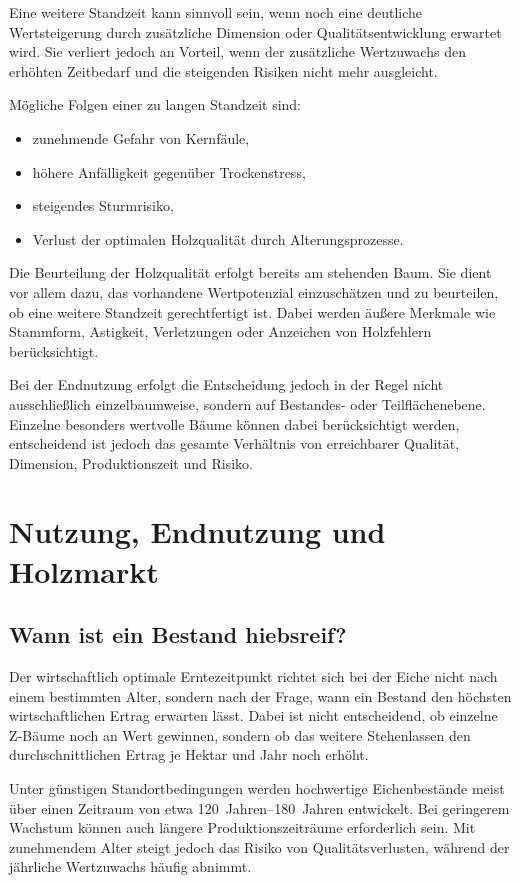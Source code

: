 \documentclass[twocolumn, bibliography=totoc, abstract=true]{scrartcl}
\begin{document}
Eine weitere Standzeit kann sinnvoll sein, wenn noch eine deutliche Wertsteigerung durch zusätzliche Dimension oder Qualitätsentwicklung erwartet wird. Sie verliert jedoch an Vorteil, wenn der zusätzliche Wertzuwachs den erhöhten Zeitbedarf und die steigenden Risiken nicht mehr ausgleicht.

Mögliche Folgen einer zu langen Standzeit sind:

\begin{itemize}
\item zunehmende Gefahr von Kernfäule,
\item höhere Anfälligkeit gegenüber Trockenstress,
\item steigendes Sturmrisiko,
\item Verlust der optimalen Holzqualität durch Alterungsprozesse.
\end{itemize}

Die Beurteilung der Holzqualität erfolgt bereits am stehenden Baum. Sie dient vor allem dazu, das vorhandene Wertpotenzial einzuschätzen und zu beurteilen, ob eine weitere Standzeit gerechtfertigt ist. Dabei werden äußere Merkmale wie Stammform, Astigkeit, Verletzungen oder Anzeichen von Holzfehlern berücksichtigt.

Bei der Endnutzung erfolgt die Entscheidung jedoch in der Regel nicht ausschließlich einzelbaumweise, sondern auf Bestandes- oder Teilflächenebene. Einzelne besonders wertvolle Bäume können dabei berücksichtigt werden, entscheidend ist jedoch das gesamte Verhältnis von erreichbarer Qualität, Dimension, Produktionszeit und Risiko.


\section{Nutzung, Endnutzung und Holzmarkt}

\subsection{Wann ist ein Bestand hiebsreif?}

Der wirtschaftlich optimale Erntezeitpunkt richtet sich bei der Eiche nicht nach einem bestimmten Alter, sondern nach der Frage, wann ein Bestand den höchsten wirtschaftlichen Ertrag erwarten lässt. Dabei ist nicht entscheidend, ob einzelne Z-Bäume noch an Wert gewinnen, sondern ob das weitere Stehenlassen den durchschnittlichen Ertrag je Hektar und Jahr noch erhöht.

Unter günstigen Standortbedingungen werden hochwertige Eichenbestände meist über einen Zeitraum von etwa \qtyrange{120}{180}{Jahren} entwickelt. Bei geringerem Wachstum können auch längere Produktionszeiträume erforderlich sein. Mit zunehmendem Alter steigt jedoch das Risiko von Qualitätsverlusten, während der jährliche Wertzuwachs häufig abnimmt.
\end{document}
